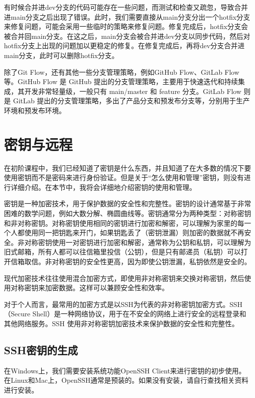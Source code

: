 \documentclass[../main.tex]{subfiles}
\begin{document}
有时候合并进dev分支的代码可能存在一些问题，而测试和检查又疏忽，导致合并进main分支之后出现了错误。此时，我们需要直接从main分支分出一个hotfix分支来修复问题，可能会采用一些临时的策略来修复问题。修复完成后，hotfix分支会被合并回main分支。在这之后，main分支会被合并进dev分支以同步代码，然后对hotfix分支上出现的问题加以更稳定的修复。在修复完成后，再将dev分支合并进main分支，此时可以删除hotfix分支。

除了Git Flow，还有其他一些分支管理策略，例如GitHub Flow、GitLab Flow等。GitHub Flow 是 GitHub 提出的分支管理策略，主要用于快速迭代和持续集成，其开发非常轻量级，一般只有 main/master 和 feature 分支。GitLab Flow 则是 GitLab 提出的分支管理策略，多出了产品分支和预发布分支等，分别用于生产环境和预发布环境。

\section{密钥与远程}

在初阶课程中，我们已经知道了密钥是什么东西，并且知道了在大多数的情况下要使用密钥而不是密码来进行身份验证。但是关于“怎么使用和管理”密钥，则没有进行详细介绍。在本节中，我将会详细地介绍密钥的使用和管理。

密钥是一种加密技术，用于保护数据的安全性和完整性。密钥的设计通常基于非常困难的数学问题，例如大数分解、椭圆曲线等。密钥通常分为两种类型：对称密钥和非对称密钥。对称密钥使用相同的密钥进行加密和解密，可以理解为家里的每一个人都使用同一把钥匙来开门，如果钥匙丢了（密钥泄漏）则加密的数据就不再安全。非对称密钥使用一对密钥进行加密和解密，通常称为公钥和私钥，可以理解为旧式邮箱，所有人都可以往信箱里投信（公钥），但是只有邮递员（私钥）可以打开信箱取信。非对称密钥的安全性更高，因为即使公钥泄漏，私钥依然是安全的。

现代加密技术往往使用混合加密方式，即使用非对称密钥来交换对称密钥，然后使用对称密钥来加密数据。这样可以兼顾安全性和效率。

对于个人而言，最常用的加密方式是以SSH为代表的非对称密钥加密方式。SSH（Secure Shell）是一种网络协议，用于在不安全的网络上进行安全的远程登录和其他网络服务。SSH 使用非对称密钥加密技术来保护数据的安全性和完整性。

\subsection{SSH密钥的生成}

在Windows上，我们需要安装系统功能OpenSSH Client来进行密钥的初步使用。在Linux和Mac上，OpenSSH通常是预装的。如果没有安装，请自行查找相关资料进行安装。
\end{document}
